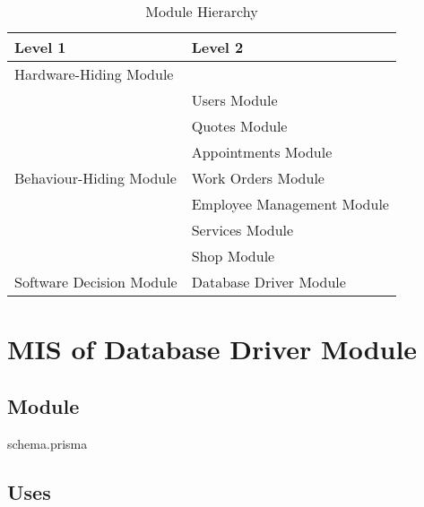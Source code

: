 \documentclass[12pt, titlepage]{article}
\begin{document}
\begin{table}[H]
	\centering
	\begin{tabular}{p{} p{}}
		\toprule
		\textbf{Level 1}                                      & \textbf{Level 2}           \\
		\midrule

		Hardware-Hiding Module                                & ~                          \\

		\midrule

		\multirow{7}{0.3\textwidth}{Behaviour-Hiding Module}  & Users Module               \\
		                                                      & Quotes Module              \\
		                                                      & Appointments Module        \\
		                                                      & Work Orders Module         \\
		                                                      & Employee Management Module \\
		                                                      & Services Module            \\
		                                                      & Shop Module                \\
		\midrule

		\multirow{1}{0.3\textwidth}{Software Decision Module} & Database Driver Module     \\

		\bottomrule
	\end{tabular}
	\caption{Module Hierarchy}
	\label{TblMH}
\end{table}

\newpage

\section{MIS of Database Driver Module} \label{mDBDriver}
\subsection{Module}

schema.prisma

\subsection{Uses}
\end{document}
